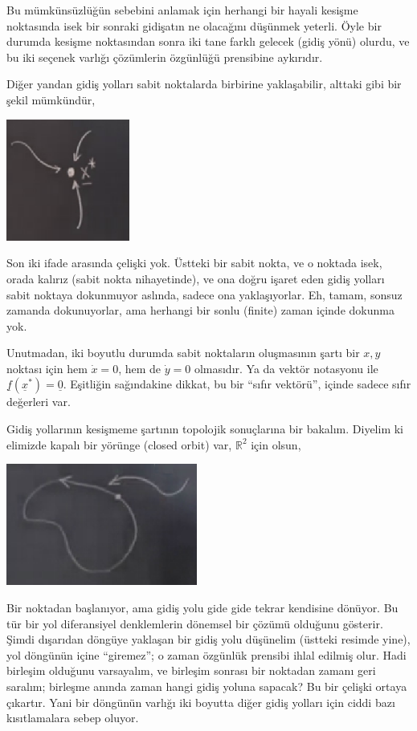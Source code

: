 \documentclass[12pt,fleqn]{article}\usepackage{../../common}
\begin{document}
Bu mümkünsüzlüğün sebebini anlamak için herhangi bir hayali kesişme noktasında
isek bir sonraki gidişatın ne olacağını düşünmek yeterli. Öyle bir durumda
kesişme noktasından sonra iki tane farklı gelecek (gidiş yönü) olurdu, ve bu iki
seçenek varlığı çözümlerin özgünlüğü prensibine aykırıdır.

Diğer yandan gidiş yolları sabit noktalarda birbirine yaklaşabilir, alttaki gibi
bir şekil mümkündür,

\includegraphics[height=4cm]{05_04.png}

Son iki ifade arasında çelişki yok. Üstteki bir sabit nokta, ve o noktada isek,
orada kalırız (sabit nokta nihayetinde), ve ona doğru işaret eden gidiş yolları
sabit noktaya dokunmuyor aslında, sadece ona yaklaşıyorlar. Eh, tamam, sonsuz
zamanda dokunuyorlar, ama herhangi bir sonlu (finite) zaman içinde dokunma yok.

Unutmadan, iki boyutlu durumda sabit noktaların oluşmasının şartı bir $x,y$
noktası için hem $\dot{x}=0$, hem de $\dot{y}=0$ olmasıdır. Ya da vektör
notasyonu ile $\underline{f}(\underline{x}^*)=\underline{0}$. Eşitliğin sağındakine
dikkat, bu bir ``sıfır vektörü'', içinde sadece sıfır değerleri var.

Gidiş yollarının kesişmeme şartının topolojik sonuçlarına bir bakalım. Diyelim
ki elimizde kapalı bir yörünge (closed orbit) var, $\mathbb{R}^2$ için olsun,

\includegraphics[height=4cm]{05_05.png}

Bir noktadan başlanıyor, ama gidiş yolu gide gide tekrar kendisine dönüyor. Bu
tür bir yol diferansiyel denklemlerin dönemsel bir çözümü olduğunu
gösterir. Şimdi dışarıdan döngüye yaklaşan bir gidiş yolu düşünelim (üstteki
resimde yine), yol döngünün içine ``giremez''; o zaman özgünlük prensibi ihlal
edilmiş olur. Hadi birleşim olduğunu varsayalım, ve birleşim sonrası bir
noktadan zamanı geri saralım; birleşme anında zaman hangi gidiş yoluna sapacak?
Bu bir çelişki ortaya çıkartır. Yani bir döngünün varlığı iki boyutta diğer
gidiş yolları için ciddi bazı kısıtlamalara sebep oluyor.
\end{document}
